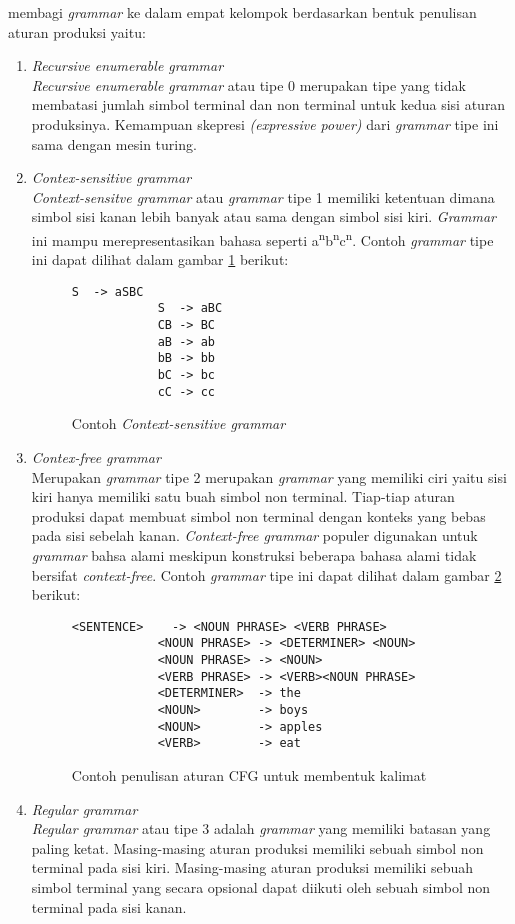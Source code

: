 \citet{bar_feigenbaum} membagi \emph{grammar} ke dalam empat kelompok berdasarkan bentuk penulisan aturan produksi yaitu:
\begin{enumerate}
	\item \emph{Recursive enumerable grammar}\\
	\emph{Recursive enumerable grammar} atau tipe 0 merupakan tipe yang tidak membatasi jumlah simbol terminal dan non terminal untuk kedua sisi aturan produksinya. Kemampuan skepresi \emph{(expressive power)} dari \emph{grammar} tipe ini sama dengan mesin turing.
	\item \emph{Contex-sensitive grammar}\\
	\emph{Context-sensitve grammar} atau \emph{grammar} tipe 1 memiliki ketentuan dimana simbol sisi kanan lebih banyak atau sama dengan simbol sisi kiri. \emph{Grammar} ini mampu merepresentasikan bahasa seperti a\textsuperscript{n}b\textsuperscript{n}c\textsuperscript{n}. Contoh \emph{grammar} tipe ini dapat dilihat dalam gambar \ref{fig:contoh_csg} berikut:
	\begin{figure}[ht]
		\centering
		\captionsetup{width=0.85\textwidth}
		\begin{lstlisting}[xleftmargin=30pt]
			S  -> aSBC
			S  -> aBC
			CB -> BC
			aB -> ab
			bB -> bb
			bC -> bc
			cC -> cc\end{lstlisting}
		\caption{Contoh \emph{Context-sensitive grammar} \citep{bar_feigenbaum}}
		\label{fig:contoh_csg}
	\end{figure}

	\item \emph{Contex-free grammar}\\
	Merupakan \emph{grammar} tipe 2 merupakan \emph{grammar} yang memiliki ciri yaitu sisi kiri hanya memiliki satu buah simbol non terminal. Tiap-tiap aturan produksi dapat membuat simbol non terminal dengan konteks yang bebas pada sisi sebelah kanan. \emph{Context-free grammar} populer digunakan untuk \emph{grammar} bahsa alami meskipun konstruksi beberapa bahasa alami tidak bersifat \emph{context-free}. Contoh \emph{grammar} tipe ini dapat dilihat dalam gambar \ref{fig:contoh_cfg} berikut:
	\begin{figure}[hb]
		\centering
		\captionsetup{width=0.85\textwidth}
		\begin{lstlisting}[xleftmargin=30pt]
			<SENTENCE>    -> <NOUN PHRASE> <VERB PHRASE>
			<NOUN PHRASE> -> <DETERMINER> <NOUN>
			<NOUN PHRASE> -> <NOUN>
			<VERB PHRASE> -> <VERB><NOUN PHRASE>
			<DETERMINER>  -> the
			<NOUN> 		  -> boys
			<NOUN>		  -> apples
			<VERB>		  -> eat\end{lstlisting}
		\caption{Contoh penulisan aturan CFG untuk membentuk kalimat \citep{bar_feigenbaum}}
		\label{fig:contoh_cfg}
	\end{figure}


	\item \emph{Regular grammar}\\
	\emph{Regular grammar} atau tipe 3 adalah \emph{grammar} yang memiliki batasan yang paling ketat. Masing-masing aturan produksi memiliki sebuah simbol non terminal pada sisi kiri. Masing-masing aturan produksi memiliki sebuah simbol terminal yang secara opsional dapat diikuti oleh sebuah simbol non terminal pada sisi kanan.
\end{enumerate}